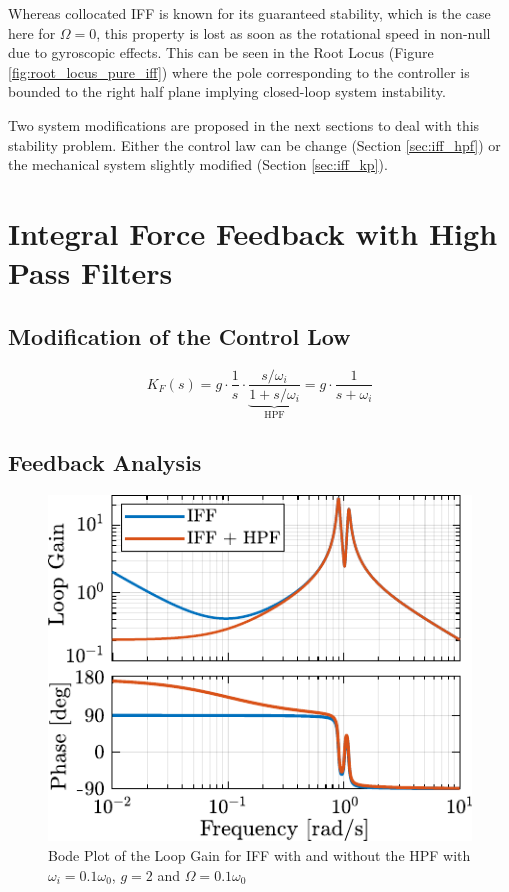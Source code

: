 \documentclass{ISMA_USD2020}
\begin{document}
Whereas collocated IFF is known for its guaranteed stability, which is the case here for \(\Omega = 0\), this property is lost as soon as the rotational speed in non-null due to gyroscopic effects.
This can be seen in the Root Locus (Figure \ref{fig:root_locus_pure_iff}) where the pole corresponding to the controller is bounded to the right half plane implying closed-loop system instability.

Two system modifications are proposed in the next sections to deal with this stability problem.
Either the control law can be change (Section \ref{sec:iff_hpf}) or the mechanical system slightly modified (Section \ref{sec:iff_kp}).

\section{Integral Force Feedback with High Pass Filters}
\label{sec:org6cc7c03}
\label{sec:iff_hpf}
\subsection{Modification of the Control Low}
\label{sec:org9575a34}
\begin{equation}
\label{eq:IFF_LHF}
  K_{F}(s) = g \cdot \frac{1}{s} \cdot \underbrace{\frac{s/\omega_i}{1 + s/\omega_i}}_{\text{HPF}} = g \cdot \frac{1}{s + \omega_i}
\end{equation}


\subsection{Feedback Analysis}
\label{sec:orgbc7c7f2}
\begin{figure}[htbp]
\centering
\includegraphics[scale=1]{figs/loop_gain_modified_iff.pdf}
\caption{\label{fig:loop_gain_modified_iff}Bode Plot of the Loop Gain for IFF with and without the HPF with \(\omega_i = 0.1 \omega_0\), \(g = 2\) and \(\Omega = 0.1 \omega_0\)}
\end{figure}
\end{document}
